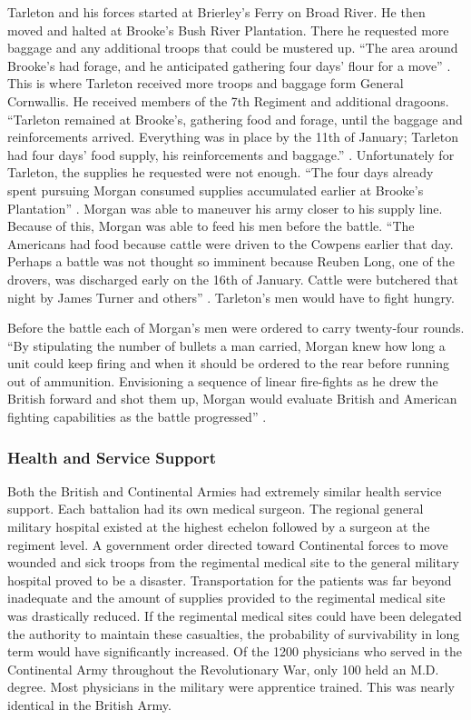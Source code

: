 Tarleton and his forces started at Brierley’s Ferry on Broad River.  He then
moved and halted at Brooke’s Bush River Plantation.  There he requested more
baggage and any additional troops that could be mustered up.  “The area around
Brooke’s had forage, and he anticipated gathering four days’ flour for a move”
\cite[p. 49]{babits_devil_2001}.  This is where Tarleton received more troops and baggage form
General Cornwallis.  He received members of the 7th Regiment and additional
dragoons.  “Tarleton remained at Brooke’s, gathering food and forage, until the
baggage and reinforcements arrived. Everything was in place by the 11th of
January; Tarleton had four days’ food supply, his reinforcements and baggage.”
\cite[p.49]{babits_devil_2001}.  Unfortunately for Tarleton, the supplies he requested were not
enough.  “The four days already spent pursuing Morgan consumed supplies
accumulated earlier at Brooke’s Plantation” \cite[p. 53]{babits_devil_2001}.  Morgan was able to
maneuver his army closer to his supply line.  Because of this, Morgan was able
to feed his men before the battle.  “The Americans had food because cattle were
driven to the Cowpens earlier that day.  Perhaps a battle was not thought so
imminent because Reuben Long, one of the drovers, was discharged early on the
16th of January.  Cattle were butchered that night by James Turner and others”
\cite[p.55]{babits_devil_2001}.  Tarleton’s men would have to fight hungry.

Before the battle each of Morgan’s men were ordered to carry twenty-four rounds.
“By stipulating the number of bullets a man carried, Morgan knew how long a unit
could keep firing and when it should be ordered to the rear before running out
of ammunition.  Envisioning a sequence of linear fire-fights as he drew the
British forward and shot them up, Morgan would evaluate British and American
fighting capabilities as the battle progressed” \cite[p.56]{babits_devil_2001}.   


\subsubsection{Health and Service Support}

Both the British and Continental Armies had extremely similar health
service support.  Each battalion had its own medical surgeon.  The regional
general military hospital existed at the highest echelon followed by a surgeon
at the regiment level.  A government order directed toward Continental forces to
move wounded and sick troops from the regimental medical site to the general
military hospital proved to be a disaster.  Transportation for the patients was
far beyond inadequate and the amount of supplies provided to the regimental
medical site was drastically reduced.  If the regimental medical sites could
have been delegated the authority to maintain these casualties, the probability
of survivability in long term would have significantly increased.   Of the 1200
physicians who served in the Continental Army throughout the Revolutionary War,
only 100 held an M.D. degree.  Most physicians in the military were apprentice
trained.  This was nearly identical in the British Army.  

